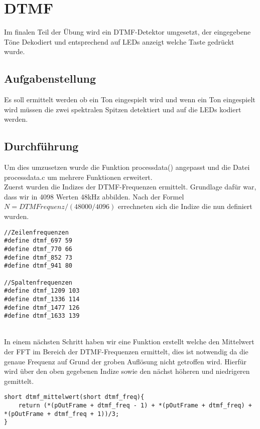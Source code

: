 \chapter{DTMF}\label{CDTMF}
Im finalen Teil der Übung wird ein DTMF-Detektor umgesetzt, der eingegebene Töne Dekodiert und entsprechend auf LEDs anzeigt welche Taste gedrückt wurde.
\section{Aufgabenstellung}\label{TDTMF}
Es soll ermittelt werden ob ein Ton eingespielt wird und wenn ein Ton eingespielt wird müssen die zwei spektralen Spitzen detektiert und auf die LEDs kodiert werden.
\section{Durchführung}\label{DDTMF}
Um dies umzusetzen wurde die Funktion process\textunderscore data() angepasst und die Datei process\textunderscore data.c um mehrere Funktionen erweitert.\\
Zuerst wurden die Indizes der DTMF-Frequenzen ermittelt. Grundlage dafür war, dass wir in 4098 Werten 48kHz abbilden. Nach der Formel \begin{math} N=DTMFrequenz/(48000/4096) \end{math} errechneten sich die Indize die nun definiert wurden.
\begin{adjustbox}{width=\textwidth, keepaspectratio} 
  \label{code:procdataKompFIR}
  \begin{lstlisting}[title=Definition der Indizes]
//Zeilenfrequenzen
#define dtmf_697 59
#define dtmf_770 66
#define dtmf_852 73
#define dtmf_941 80

//Spaltenfrequenzen
#define dtmf_1209 103
#define dtmf_1336 114
#define dtmf_1477 126
#define dtmf_1633 139
\end{lstlisting}
\end{adjustbox}\\
 In einem nächsten Schritt haben wir eine Funktion erstellt welche den Mittelwert der FFT im Bereich der DTMF-Frequenzen ermittelt, dies ist notwendig da die genaue Frequenz auf Grund der groben Auflösung nicht getroffen wird. Hierfür wird über den oben gegebenen Indize sowie den nächst höheren und niedrigeren gemittelt.\\
 \begin{adjustbox}{width=\textwidth, keepaspectratio} 
  \label{code:procdataKompFIR}
  \begin{lstlisting}[title=Mittelwert der DTMF Frequenzen]
short dtmf_mittelwert(short dtmf_freq){
	return (*(pOutFrame + dtmf_freq - 1) + *(pOutFrame + dtmf_freq) + *(pOutFrame + dtmf_freq + 1))/3;
}
\end{lstlisting}
\end{adjustbox}\\
